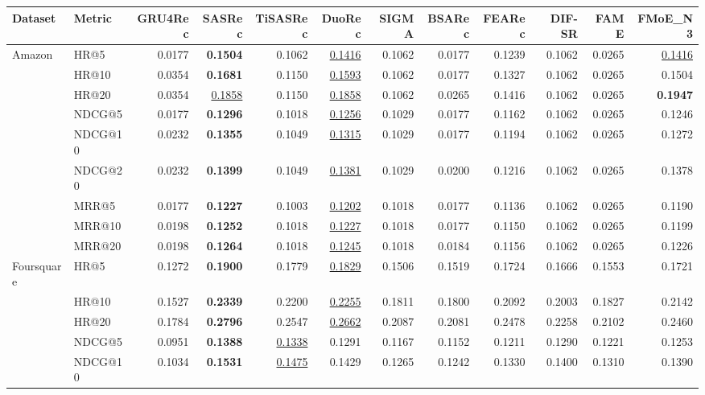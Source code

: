 \begin{tabular}{llrrrrrrrrrr}
\hline
Dataset & Metric & GRU4Rec & SASRec & TiSASRec & DuoRec & SIGMA & BSARec & FEARec & DIF-SR & FAME & FMoE\_N3 \\
\hline
Amazon & HR@5 & 0.0177 & \textbf{0.1504} & 0.1062 & \underline{0.1416} & 0.1062 & 0.0177 & 0.1239 & 0.1062 & 0.0265 & \underline{0.1416} \\
 & HR@10 & 0.0354 & \textbf{0.1681} & 0.1150 & \underline{0.1593} & 0.1062 & 0.0177 & 0.1327 & 0.1062 & 0.0265 & 0.1504 \\
 & HR@20 & 0.0354 & \underline{0.1858} & 0.1150 & \underline{0.1858} & 0.1062 & 0.0265 & 0.1416 & 0.1062 & 0.0265 & \textbf{0.1947} \\
 & NDCG@5 & 0.0177 & \textbf{0.1296} & 0.1018 & \underline{0.1256} & 0.1029 & 0.0177 & 0.1162 & 0.1062 & 0.0265 & 0.1246 \\
 & NDCG@10 & 0.0232 & \textbf{0.1355} & 0.1049 & \underline{0.1315} & 0.1029 & 0.0177 & 0.1194 & 0.1062 & 0.0265 & 0.1272 \\
 & NDCG@20 & 0.0232 & \textbf{0.1399} & 0.1049 & \underline{0.1381} & 0.1029 & 0.0200 & 0.1216 & 0.1062 & 0.0265 & 0.1378 \\
 & MRR@5 & 0.0177 & \textbf{0.1227} & 0.1003 & \underline{0.1202} & 0.1018 & 0.0177 & 0.1136 & 0.1062 & 0.0265 & 0.1190 \\
 & MRR@10 & 0.0198 & \textbf{0.1252} & 0.1018 & \underline{0.1227} & 0.1018 & 0.0177 & 0.1150 & 0.1062 & 0.0265 & 0.1199 \\
 & MRR@20 & 0.0198 & \textbf{0.1264} & 0.1018 & \underline{0.1245} & 0.1018 & 0.0184 & 0.1156 & 0.1062 & 0.0265 & 0.1226 \\
\hline
Foursquare & HR@5 & 0.1272 & \textbf{0.1900} & 0.1779 & \underline{0.1829} & 0.1506 & 0.1519 & 0.1724 & 0.1666 & 0.1553 & 0.1721 \\
 & HR@10 & 0.1527 & \textbf{0.2339} & 0.2200 & \underline{0.2255} & 0.1811 & 0.1800 & 0.2092 & 0.2003 & 0.1827 & 0.2142 \\
 & HR@20 & 0.1784 & \textbf{0.2796} & 0.2547 & \underline{0.2662} & 0.2087 & 0.2081 & 0.2478 & 0.2258 & 0.2102 & 0.2460 \\
 & NDCG@5 & 0.0951 & \textbf{0.1388} & \underline{0.1338} & 0.1291 & 0.1167 & 0.1152 & 0.1211 & 0.1290 & 0.1221 & 0.1253 \\
 & NDCG@10 & 0.1034 & \textbf{0.1531} & \underline{0.1475} & 0.1429 & 0.1265 & 0.1242 & 0.1330 & 0.1400 & 0.1310 & 0.1390 \\

\end{tabular}
